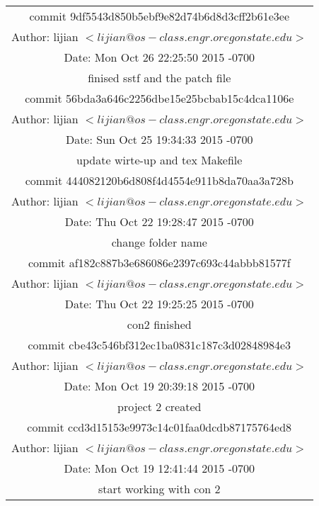 \documentclass[letterpaper,11pt,titlepage]{article}
\begin{document}
\begin{table}[!hbp]
\begin{tabular}{|c|}

\hline
commit 9df5543d850b5ebf9e82d74b6d8d3cff2b61e3ee\\
Author: lijian $<lijian@os-class.engr.oregonstate.edu>$\\
Date:   Mon Oct 26 22:25:50 2015 -0700\\
finised sstf and the patch file\\

\hline
commit 56bda3a646c2256dbe15e25bcbab15c4dca1106e\\
Author: lijian $<lijian@os-class.engr.oregonstate.edu>$\\
Date:   Sun Oct 25 19:34:33 2015 -0700\\
update wirte-up and tex Makefile\\

\hline
commit 444082120b6d808f4d4554e911b8da70aa3a728b\\
Author: lijian $<lijian@os-class.engr.oregonstate.edu>$\\
Date:   Thu Oct 22 19:28:47 2015 -0700\\
change folder name\\

\hline
commit af182c887b3e686086e2397c693c44abbb81577f\\
Author: lijian $<lijian@os-class.engr.oregonstate.edu>$\\
Date:   Thu Oct 22 19:25:25 2015 -0700\\
con2 finished\\


\hline
commit cbe43c546bf312ec1ba0831c187c3d02848984e3\\
Author: lijian $<lijian@os-class.engr.oregonstate.edu>$\\
Date:   Mon Oct 19 20:39:18 2015 -0700\\
project 2 created\\


\hline
commit ccd3d15153e9973c14c01faa0dcdb87175764ed8\\
Author: lijian $<lijian@os-class.engr.oregonstate.edu>$\\
Date:   Mon Oct 19 12:41:44 2015 -0700\\
start working with con 2\\

\hline

 
\end{tabular}
\end{table}
\end{document}
